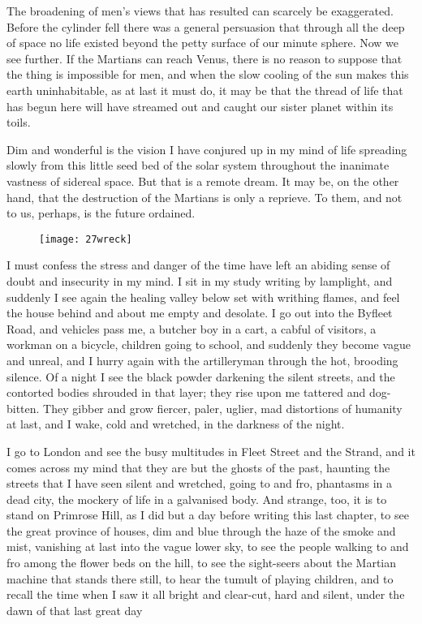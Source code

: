The broadening of men's views that has resulted can scarcely be exaggerated. Before the cylinder fell there was a general persuasion that through all the deep of space no life existed beyond the petty surface of our minute sphere. Now we see further. If the Martians can reach Venus, there is no reason to suppose that the thing is impossible for men, and when the slow cooling of the sun makes this earth uninhabitable, as at last it must do, it may be that the thread of life that has begun here will have streamed out and caught our sister planet within its toils.

Dim and wonderful is the vision I have conjured up in my mind of life spreading slowly from this little seed bed of the solar system throughout the inanimate vastness of sidereal space. But that is a remote dream. It may be, on the other hand, that the destruction of the Martians is only a reprieve. To them, and not to us, perhaps, is the future ordained.


\begin{figure}[t]
\centering
\texttt{[image: 27wreck]}
\end{figure}

I must confess the stress and danger of the time have left an abiding sense of doubt and insecurity in my mind. I sit in my study writing by lamplight, and suddenly I see again the healing valley below set with writhing flames, and feel the house behind and about me empty and desolate. I go out into the Byfleet Road, and vehicles pass me, a butcher boy in a cart, a cabful of visitors, a workman on a bicycle, children going to school, and suddenly they become vague and unreal, and I hurry again with the artilleryman through the hot, brooding silence. Of a night I see the black powder darkening the silent streets, and the contorted bodies shrouded in that layer; they rise upon me tattered and dog-bitten. They gibber and grow fiercer, paler, uglier, mad distortions of humanity at last, and I wake, cold and wretched, in the darkness of the night.

I go to London and see the busy multitudes in Fleet Street and the Strand, and it comes across my mind that they are but the ghosts of the past, haunting the streets that I have seen silent and wretched, going to and fro, phantasms in a dead city, the mockery of life in a galvanised body. And strange, too, it is to stand on Primrose Hill, as I did but a day before writing this last chapter, to see the great province of houses, dim and blue through the haze of the smoke and mist, vanishing at last into the vague lower sky, to see the people walking to and fro among the flower beds on the hill, to see the sight-seers about the Martian machine that stands there still, to hear the tumult of playing children, and to recall the time when I saw it all bright and clear-cut, hard and silent, under the dawn of that last great day\textellipsis

